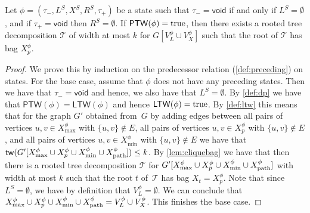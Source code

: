 \documentclass[a4paper,UKenglish,cleveref, autoref, thm-restate, numberwithinsect]{lipics-v2021}
\newcommand{\tw}{\mathsf{tw}}
\newcommand{\void}{\mathsf{void}}
\newcommand{\ptw}{\mathsf{PTW}}
\newcommand{\ltw}{\mathsf{LTW}}
\newcommand{\dpath}{\textup{path}}
\newcommand{\true}{\textup{true}}
\begin{document}
\begin{proposition}\label{prop:correctness1}
Let $\phi=(\tau_-,L^S, X^S, R^S,\tau_+)$ be a state such that $\tau_-=\void$ if and only if $L^S=\emptyset$, and if $\tau_+=\void$ then $R^S=\emptyset$.
If $\ptw(\phi)=\true$, then there exists a rooted tree decomposition $\mathcal{T}$ of width at most $k$ for $G[V^\phi_L\cup V^\phi_X]$ such that the root of $\mathcal{T}$ has bag $X^\phi_p$. 
\end{proposition}
\begin{proof}
We prove this by induction on the predecessor relation (\cref{def:preceding}) on states. For the base case, assume that $\phi$ does not have any preceding states. Then we have that $\tau_-=\void$ and hence, we also have that $L^S=\emptyset$. By \cref{def:dp} we have that $\ptw(\phi)=\ltw(\phi)$ and hence $\ltw(\phi)=\true$. 
By \cref{def:ltw} this means that for the graph $G'$ obtained from~$G$ by adding edges between all pairs of vertices $u,v\in  X^\phi_{\max}$ with $\{u,v\}\notin E$,  all pairs of vertices $u,v\in  X^\phi_p$ with $\{u,v\}\notin E$, and all pairs of vertices $u,v\in X^\phi_{\min}$ with $\{u,v\}\notin E$ we have that $\tw(G'[X^\phi_{\max}\cup X^\phi_p\cup X^\phi_{\min}\cup X^\phi_{\dpath}])\le k$. 
By \cref{lem:cliquebag} we have that then there is a rooted tree decomposition $\mathcal{T}$ for $G'[X^\phi_{\max}\cup X^\phi_p\cup X^\phi_{\min}\cup X^\phi_{\dpath}]$ with width at most $k$ such that the root $t$ of~$\mathcal{T}$ has bag $X_{t}=X^\phi_p$.
Note that since $L^S=\emptyset$, we have by definition that $V^\phi_L=\emptyset$.
We can conclude that $X^\phi_{\max}\cup X^\phi_p\cup X^\phi_{\min}\cup X^\phi_{\dpath}=V^\phi_L\cup V^\phi_X$.
This finishes the base case.







\end{proof}
\end{document}
